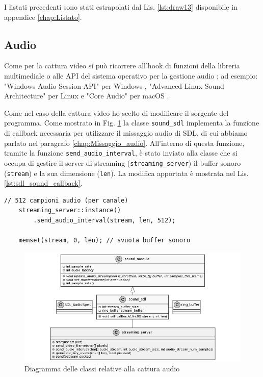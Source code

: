 I listati precedenti sono stati estrapolati dal Lis. \ref{lst:draw13} disponibile in appendice \ref{chap:Listato}.



\subsection{Audio} \label{Cattura_Audio}
Come per la cattura video si può ricorrere all'hook di funzioni della libreria multimediale o alle API del sistema operativo per la gestione audio \parencite{GamingAnywhere}; ad esempio: "Windows Audio Session API" per Windows \parencite{WASAPI}, "Advanced Linux Sound Architecture" per Linux \parencite{ALSA} e "Core Audio" per macOS \parencite{Core_Audio_api}.

Come nel caso della cattura video ho scelto di modificare il sorgente del programma. Come mostrato in Fig. \ref{fig:class_mixingSDL_streaming} la classe \verb|sound_sdl| implementa la funzione di callback necessaria per utilizzare il missaggio audio di SDL, di cui abbiamo parlato nel paragrafo \ref{chap:Missaggio_audio}. All'interno di questa funzione, tramite la funzione \verb|send_audio_interval|, è stato inviato alla classe che si occupa di gestire il server di streaming (\verb|streaming_server|) il buffer sonoro (\verb|stream|) e la sua dimensione (\verb|len|). La modifica apportata è mostrata nel Lis. \ref{lst:sdl_sound_callback}.

\begin{lstlisting}[caption=Codice aggiunto per la cattura audio, label={lst:sdl_sound_callback}]
	// 512 campioni audio (per canale)
	streaming_server::instance()
		.send_audio_interval(stream, len, 512);

	memset(stream, 0, len); // svuota buffer sonoro
\end{lstlisting}


\begin{figure}[H]
	\includegraphics[width=\linewidth]{immagini/class_mixingSDL_streaming}
	\caption{Diagramma delle classi relative alla cattura audio}
	\label{fig:class_mixingSDL_streaming}
\end{figure}

